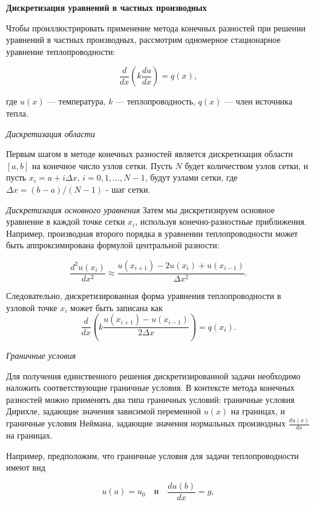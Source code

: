 \textbf{Дискретизация уравнений в частных производных}

Чтобы проиллюстрировать применение метода конечных разностей
при решении уравнений в частных производных, рассмотрим одномерное
стационарное уравнение теплопроводности:

\begin{equation*}
\frac{d}{dx}\left(k \frac{du}{dx}\right) = q(x),
\end{equation*}

где $u(x)$ — температура, $k$ — теплопроводность,
$q(x)$ — член источника тепла.

\textit{Дискретизация области}

Первым шагом в методе конечных разностей является
дискретизация области $[a, b]$ на конечное число узлов сетки.
Пусть $N$ будет количеством узлов сетки, и пусть
$x_i = a + i \Delta x$, $i = 0, 1, \ldots, N - 1$, будут узлами сетки,
где $\Delta x = (b - a) / (N - 1)$ - шаг сетки.

\textit{Дискретизация основного уравнения}
Затем мы дискретизируем основное уравнение в каждой точке сетки $x_i$,
используя конечно-разностные приближения.
Например, производная второго порядка в уравнении теплопроводности
может быть аппроксимирована формулой центральной разности:

\begin{equation*}
\frac{d^2 u(x_i)}{dx^2} \approx \frac{u(x_{i+1}) - 2u(x_i) + u(x_{i-1})}{\Delta x^2}.
\end{equation*}

Следовательно, дискретизированная форма уравнения теплопроводности
в узловой точке $x_i$ может быть записана как
\begin{equation*}
\frac{d}{dx}\left(k \frac{u(x_{i+1}) - u(x_{i-1})}{2\Delta x}\right) = q(x_i).
\end{equation*}

\textit{Граничные условия}

Для получения единственного решения дискретизированной
задачи необходимо наложить соответствующие граничные условия.
В контексте метода конечных разностей можно применять два
типа граничных условий: граничные условия Дирихле,
задающие значения зависимой переменной $u(x)$ на границах,
и граничные условия Неймана, задающие значения нормальных
производных $\frac{du(x)}{dx}$ на границах.

Например, предположим, что граничные условия для
задачи теплопроводности имеют вид

\begin{equation*}
u(a) = u_0 \quad \text{и} \quad \frac{du(b)}{dx} = g,
\end{equation*}

